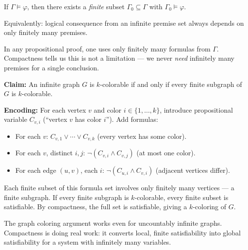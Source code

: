 \begin{corollary}\label{cor:consequence-compact}
If $\Gamma \models \varphi$, then there exists a \emph{finite} subset
$\Gamma_0 \subseteq \Gamma$ with $\Gamma_0 \models \varphi$.

Equivalently: logical consequence from an infinite premise set always depends
on only finitely many premises.
\end{corollary}



\begin{remark}
In any propositional proof, one uses only finitely many formulas from $\Gamma$.
Compactness tells us this is not a limitation — we never \emph{need} infinitely
many premises for a single conclusion.
\end{remark}

\begin{example}\label{ex:graph-color}
\textbf{Claim:} An infinite graph $G$ is $k$-colorable if and only if every
finite subgraph of $G$ is $k$-colorable.

\textbf{Encoding:} For each vertex $v$ and color $i \in \{1,\ldots,k\}$,
introduce propositional variable $C_{v,i}$ (``vertex $v$ has color $i$'').
Add formulas:
\begin{itemize}
  \item For each $v$: $C_{v,1} \vee \cdots \vee C_{v,k}$ (every vertex has some color).
  \item For each $v$, distinct $i,j$: $\neg(C_{v,i} \wedge C_{v,j})$ (at most one color).
  \item For each edge $(u,v)$, each $i$: $\neg(C_{u,i} \wedge C_{v,i})$ (adjacent vertices differ).
\end{itemize}
Each finite subset of this formula set involves only finitely many vertices —
a finite subgraph. If every finite subgraph is $k$-colorable, every finite
subset is satisfiable. By compactness, the full set is satisfiable, giving a
$k$-coloring of $G$.
\end{example}

\begin{remark}
The graph coloring argument works even for uncountably infinite graphs.
Compactness is doing real work: it converts local, finite satisfiability into
global satisfiability for a system with infinitely many variables.
\end{remark}
